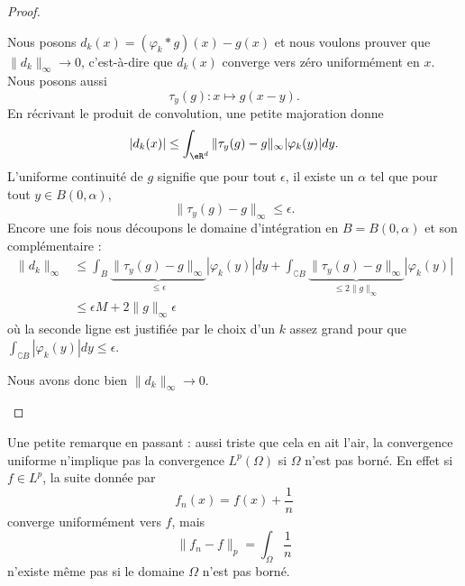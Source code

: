 \begin{proof}
\begin{enumerate}
		      Nous posons \( d_k(x)=(\varphi_k*g)(x)-g(x)\) et nous voulons prouver que \( \| d_k \|_{\infty}\to 0\), c'est-à-dire que \( d_k(x)\) converge vers zéro uniformément en \( x\). Nous posons aussi
		      \begin{equation}
			      \tau_y(g)\colon x\mapsto g(x-y).
		      \end{equation}
		      En récrivant le produit de convolution, une petite majoration donne
		      \begin{equation}
			      | d_k(x) |\leq \int_{\eR^d}\| \tau_y(g)-g \|_{\infty}| \varphi_k(y) |dy.
		      \end{equation}
		      L'uniforme continuité de \( g\) signifie que pour tout \( \epsilon\), il existe un \( \alpha\) tel que pour tout \( y\in B(0,\alpha)\),
		      \begin{equation}
			      \| \tau_y(g)-g \|_{\infty}\leq \epsilon.
		      \end{equation}
		      Encore une fois nous découpons le domaine d'intégration en \( B=B(0,\alpha)\) et son complémentaire :
		      \begin{subequations}
			      \begin{align}
				      \| d_k \|_{\infty} & \leq\int_B\underbrace{\| \tau_y(g)-g \|_{\infty}}_{\leq \epsilon}| \varphi_k(y) |dy+\int_{\complement B}\underbrace{\| \tau_y(g)-g \|_{\infty}}_{\leq 2\| g \|_{\infty}}| \varphi_k(y) | \\
				                         & \leq \epsilon M+2\| g \|_{\infty}\epsilon
			      \end{align}
		      \end{subequations}
		      où la seconde ligne est justifiée par le choix d'un \( k\) assez grand pour que \( \int_{\complement B}| \varphi_k(y) |dy\leq \epsilon\).

		      Nous avons donc bien \( \| d_k \|_{\infty}\to 0\).
	\end{enumerate}
\end{proof}

\begin{example}
	Une petite remarque en passant : aussi triste que cela en ait l'air, la convergence uniforme n'implique pas la convergence \( L^p(\Omega)\) si \( \Omega\) n'est pas borné. En effet si \( f\in L^p\), la suite donnée par
	\begin{equation}
		f_n(x)=f(x)+\frac{1}{ n }
	\end{equation}
	converge uniformément vers \( f\), mais
	\begin{equation}
		\| f_n-f \|_p=\int_{\Omega}\frac{1}{ n }
	\end{equation}
	n'existe même pas si le domaine \( \Omega\) n'est pas borné.
\end{example}

